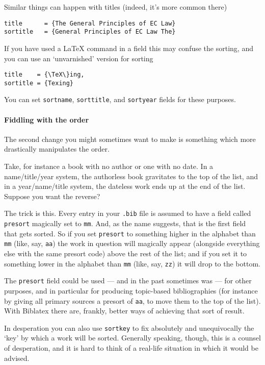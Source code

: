 Similar things can happen with titles (indeed, it's more common
there)\label{sorting:sorttitle}
\begin{Verbatim}
title      = {The General Principles of EC Law}
sortitle   = {General Principles of EC Law The}
\end{Verbatim}

If you have used a LaTeX command in a field this may confuse the
sorting, and you can use an `unvarnished' version for sorting
\begin{Verbatim}
title    = {\TeX\}ing,
sortitle = {Texing}
\end{Verbatim}

You can set \texttt{sortname}, \texttt{sorttitle}, and \texttt{sortyear}
fields for these purposes.

\paragraph{Fiddling with the order} The second change you might sometimes
want to make is something which more drastically manipulates the order.

Take, for instance a book with no author or one with no date. In a
name/title/year system, the authorless book gravitates to the top of
the list, and in a year/name/title system, the dateless work ends up
at the end of the list. Suppose you want the reverse?

The trick is this. Every entry in your \texttt{.bib} file is assumed
to have a field called \texttt{presort} magically set to
\texttt{mm}. And, as the name suggests, that is the first field that
gets sorted. So if you set \texttt{presort} to something higher in the
alphabet than \texttt{mm} (like, say, \texttt{aa}) the work in
question will magically appear (alongside everything else with the
same presort code) above the rest of the list; and if you set it to
something lower in the alphabet than \texttt{mm} (like, say,
\texttt{zz}) it will drop to the bottom.

The \texttt{presort} field could be used --- and in the past sometimes
was --- for other purposes, and in particular for producing
topic-based bibliographies (for instance by giving all primary sources
a presort of \texttt{aa}, to move them to the top of the list). With
Biblatex there are, frankly, better ways of achieving that sort of
result.

In desperation you can also use \texttt{sortkey} to fix absolutely and
unequivocally the `key' by which a work will be sorted. Generally
speaking, though, this is a counsel of desperation, and it is hard to
think of a real-life situation in which it would be advised.

